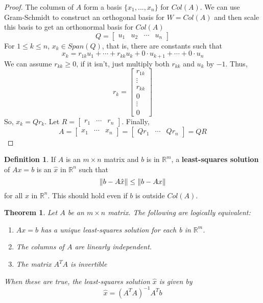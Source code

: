 \documentclass[letterpaper]{article}
\newtheorem{theorem}{Theorem}
\theoremstyle{definition}
\newtheorem{definition}{Definition}[section]
\DeclarePairedDelimiter{\norm}{\lVert}{\rVert}
\begin{document}
\begin{proof}
The columsn of $A$ form a basis $\{x_1, ..., x_n\}$ for $Col(A)$. We can use Gram-Schmidt to construct an orthogonal basis for $W=Col(A)$ and then scale this basis to get an orthonormal basis for $Col(A)$ $$Q = \begin{bmatrix}
u_1 & u_2 & \cdots & u_n
\end{bmatrix}$$
For $1 \leq k \leq n$, $x_k \in Span(Q)$, that is, there are constants such that 
$$x_k =r_{1k}u_{1} + \cdots + r_{kk}u_{k} + 0 \cdot u_{k+1} + \cdots + 0 \cdot u_{n}$$
We can assume $r_{kk} \geq 0$, if it isn't, just multiply both $r_{kk}$ and $u_{k}$ by $-1$. Thus, 
$$r_{k} = \begin{bmatrix}
r_{1k} \\
\vdots \\
r_{kk} \\
0 \\
\vdots \\
0
\end{bmatrix}$$
So, $x_{k} = Qr_{k}$. Let $R = \begin{bmatrix}
r_{1} & \cdots & r_{n}
\end{bmatrix}$. Finally, 
$$A = \begin{bmatrix}
x_{1} & \cdots & x_{n}
\end{bmatrix} = \begin{bmatrix}
Qr_{1} & \cdots & Qr_{n}
\end{bmatrix} = QR$$
\end{proof}

\begin{definition}
If $A$ is an $m \times n$ matrix and $b$ is in $\mathbb{R}^m$, a \textbf{least-squares solution} of $Ax = b$ is an $\hat{x}$ in $\mathbb{R}^n$ such that 
$$\norm{b - A\hat{x}} \leq \norm{b - Ax}$$
for all $x$ in $\mathbb{R}^n$. This should hold even if $b$ is outside $Col(A)$. 
\end{definition}

\begin{theorem}
Let $A$ be an $m \times n$ matrix. The following are logically equivalent:
\begin{enumerate}
	\item $Ax = b$ has a unique least-squares solution for each b in $\mathbb{R}^m$. 
	\item The columns of $A$ are linearly independent. 
	\item The matrix $A^{T}A$ is invertible
\end{enumerate}
When these are true, the least-squares solution $\hat{x}$ is given by 
$$\hat{x} = (A^{T}A)^{-1}A^{T}b$$
\end{theorem}
\end{document}
